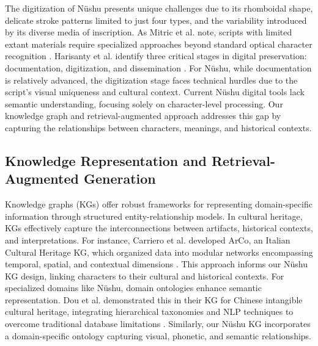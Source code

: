 \documentclass{article}
\begin{document}

    The digitization of N\"{u}shu presents unique challenges due to its rhomboidal shape, delicate stroke patterns limited to just four types, and the variability introduced by its diverse media of inscription. As Mitric et al. note, scripts with limited extant materials require specialized approaches beyond standard optical character recognition \cite{mitricAIComputerVision2024}. Harisanty et al. identify three critical stages in digital preservation: documentation, digitization, and dissemination \cite{harisantyculturalheritagepreservation2024}. For N\"{u}shu, while documentation is relatively advanced, the digitization stage faces technical hurdles due to the script's visual uniqueness and cultural context.
    Current N\"{u}shu digital tools lack semantic understanding, focusing solely on character-level processing. Our knowledge graph and retrieval-augmented approach addresses this gap by capturing the relationships between characters, meanings, and historical contexts.

\subsection{Knowledge Representation and Retrieval-Augmented Generation}
\label{ssec:kg_rag}
    Knowledge graphs (KGs) offer robust frameworks for representing domain-specific information through structured entity-relationship models. In cultural heritage, KGs effectively capture the interconnections between artifacts, historical contexts, and interpretations. For instance, Carriero et al. developed ArCo, an Italian Cultural Heritage KG, which organized data into modular networks encompassing temporal, spatial, and contextual dimensions \cite{carrieroArCoItalianCultural2019}. This approach informs our N\"{u}shu KG design, linking characters to their cultural and historical contexts.
    For specialized domains like N\"{u}shu, domain ontologies enhance semantic representation. Dou et al. demonstrated this in their KG for Chinese intangible cultural heritage, integrating hierarchical taxonomies and NLP techniques to overcome traditional database limitations \cite{douKnowledgeGraphBased2018}. Similarly, our N\"{u}shu KG incorporates a domain-specific ontology capturing visual, phonetic, and semantic relationships.
\end{document}
